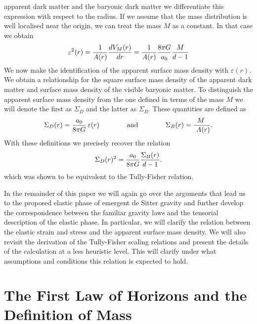 \documentclass[a4paper,12pt]{article}
\begin{document}
apparent dark matter and the baryonic dark matter we differentiate this expression with respect to the 
radius.  If we assume that the mass distribution is well localised near the origin,  we can treat the mass 
$M$ as a constant. In that case we obtain
\begin{equation}
\varepsilon^2(r) =
{1\over A(r)} {dV_M(r)\over dr}  = {1\over A(r)} {8\pi G \over a_0} {M\over {d-1}}
\end{equation}
We now make the identification of the apparent surface mass density with $\varepsilon(r)$. We obtain
a relationship for the square surface mass density of the apparent dark matter and surface mass density 
of the visible baryonic matter. To distinguish the apparent surface mass density from the one defined in terms of the mass $M$ we will denote the first as $\Sigma_D$ and the latter as $\Sigma_B$. These quantities are defined as
\begin{equation}
\Sigma_D(r) = {a_0\over 8\pi G} \,\varepsilon(r) \qquad \qquad \mbox{and}\qquad \qquad \Sigma_B(r) = {\! M\,\over \ A(r)} .
\end{equation}
With these definitions we precisely recover the relation
\begin{equation}
\Sigma_{D}(r)^2 = {a_0\over 8\pi G} {\Sigma_B (r)\over d-1}	 .
\end{equation}
which was shown to be equivalent to the Tully-Fisher relation. 
 
 In the remainder of this paper we will again go over the arguments that lead us to the proposed elastic phase of emergent de Sitter gravity and further develop the correspondence between the familiar gravity laws and the tensorial description of the elastic phase. In particular, we will clarify the relation between the elastic strain and stress and the apparent surface mass density. We will also revisit the derivation of the Tully-Fisher scaling relations and present the details of the calculation at a less heuristic level. This will clarify under what assumptions and   conditions this relation is expected to hold. 





\section{The First Law of Horizons and the Definition of Mass}
\setcounter{equation}{0}
\end{document}
